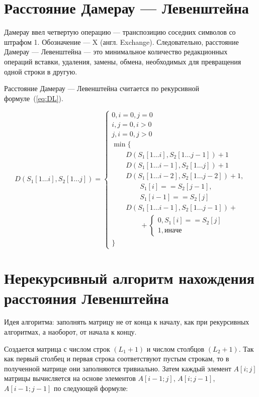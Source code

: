 \section{Расстояние Дамерау --- Левенштейна}

Дамерау ввел четвертую операцию --- транспозицию соседних символов со штрафом 1. Обозначение --- X (англ. Exchange). Следовательно, расстояние Дамерау --- Левенштейна --- это минимальное количество редакционных операций вставки, удаления, замены, обмена, необходимых для превращения одной строки в другую.

Расстояние Дамерау --- Левенштейна считается по рекурсивной формуле~(\ref{eq:DL}).

\begin{equation}
	\label{eq:DL}
	D(S_{1}[1\dots i], S_{2}[1\dots j]) = \begin{cases}
		
		0, i = 0, j = 0\\
		i, j = 0, i > 0\\
		j, i = 0, j > 0\\
		\min \lbrace \\
		\qquad D(S_{1}[1\dots i], S_{2}[1\dots j-1]) + 1\\
		\qquad D(S_{1}[1\dots i-1], S_{2}[1\dots j]) + 1 \\
		\qquad D(S_{1}[1\dots i-2], S_{2}[1\dots j-2]) + 1,\\
		\quad\quad\quad\quad S_{1}[i] == S_{2}[j-1], \\
		\quad\quad\quad\quad S_{1}[i-1] == S_{2}[j]\\
		\qquad D(S_{1}[1\dots i-1], S_{2}[1\dots j-1]) + \\
		\qquad\qquad +\begin{cases}
			0, S_{1}[i] == S_{2}[j]\\
			1, иначе
		\end{cases}\\
		\rbrace
	\end{cases}
\end{equation}

\section{Нерекурсивный алгоритм нахождения расстояния Левенштейна}

Идея алгоритма: заполнять матрицу не от конца к началу, как при рекурсивных алгоритмах, а наоборот, от начала к концу.

Создается матрица с числом строк $(L_{1}+1)$ и числом столбцов $(L_{2}+1)$. Так как первый столбец и первая строка соответствуют пустым строкам, то в полученной матрице они заполняются тривиально. Затем каждый элемент $A[i;j]$ матрицы вычисляется на основе элементов $A[i-1;j]$, $A[i;j-1]$,~$A[i-1;j-1]$ по следующей формуле:


